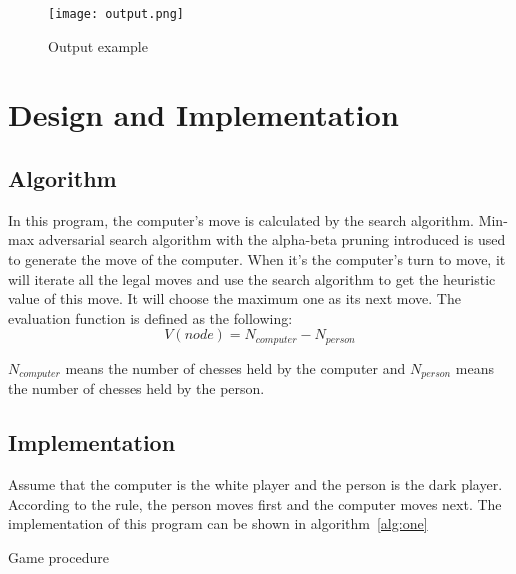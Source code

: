 \documentclass[a4paper, 11pt]{article}
\begin{document}
\begin{figure}[!htbp]
  \texttt{[image: output.png]}
  \caption{Output example}
  \label{fig:one}
\end{figure}


\section*{Design and Implementation}
\subsection{Algorithm}
In this program, the computer's move is calculated by the search algorithm. Min-max adversarial search algorithm with the alpha-beta pruning introduced is used to generate the move of the computer. When it's the computer's turn to move, it will iterate all the legal moves and use the search algorithm to get the heuristic value of this move. It will choose the maximum one as its next move. The evaluation function is defined as the following:
\begin{equation}
\label{eqn:09}
V(node) = N_{computer} - N_{person}
\end{equation}

$N_{computer}$ means the number of chesses held by the computer and $N_{person}$ means the number of chesses held by the person.

\subsection{Implementation}
Assume that the computer is the white player and the person is the dark player. According to the rule, the person moves first and the computer moves next. The implementation of this program can be shown in algorithm~\ref{alg:one}
\begin{algorithm}[!htbp]
\SetAlgoNoLine
{}
\caption{Game procedure}
\label{alg:one}
\end{algorithm}
\end{document}
